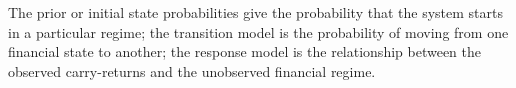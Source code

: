 \documentclass[12pt, a4paper, oneside]{article}\usepackage[]{graphicx}\usepackage[]{color}
\begin{document}

The prior or initial state probabilities give the probability that the system starts in a particular regime; the transition model is the probability of moving from one financial state to another; the response model is the relationship between the observed carry-returns and the unobserved financial regime.  
\end{document}
